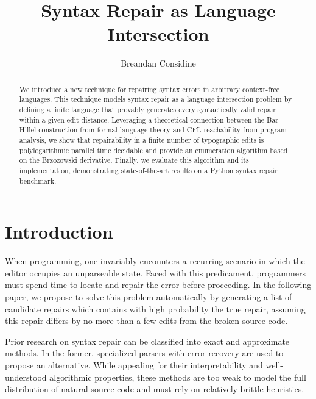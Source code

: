 \documentclass[sigplan,review,acmsmall,nonacm,screen,anonymous]{acmart}\settopmatter{printfolios=false,printccs=false,printacmref=false}
\begin{document}
%
\title{Syntax Repair as Language Intersection}
%
\begin{abstract}
We introduce a new technique for repairing syntax errors in arbitrary context-free languages. This technique models syntax repair as a language intersection problem by defining a finite language that provably generates every syntactically valid repair within a given edit distance. Leveraging a theoretical connection between the Bar-Hillel construction from formal language theory and CFL reachability from program analysis, we show that repairability in a finite number of typographic edits is polylogarithmic parallel time decidable and provide an enumeration algorithm based on the Brzozowski derivative. Finally, we evaluate this algorithm and its implementation, demonstrating state-of-the-art results on a Python syntax repair benchmark.
\end{abstract}

\author{Breandan Considine}

\maketitle

\section{Introduction}\label{sec:intro}

When programming, one invariably encounters a recurring scenario in which the editor occupies an unparseable state. Faced with this predicament, programmers must spend time to locate and repair the error before proceeding. In the following paper, we propose to solve this problem automatically by generating a list of candidate repairs which contains with high probability the true repair, assuming this repair differs by no more than a few edits from the broken source code.

Prior research on syntax repair can be classified into exact and approximate methods. In the former, specialized parsers with error recovery are used to propose an alternative. While appealing for their interpretability and well-understood algorithmic properties, these methods are too weak to model the full distribution of natural source code and must rely on relatively brittle heuristics.
\end{document}
